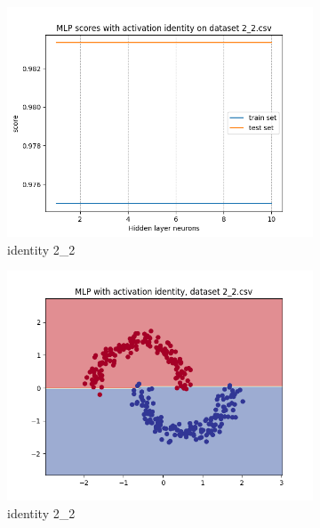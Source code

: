 \documentclass[12pt]{article}
\newcommand*{\subfigwidth}{0.24\textwidth}
\begin{document}
\begin{figure}[H]
\begin{subfigure}[t]{\subfigwidth}
        \includegraphics[width=\linewidth]{img/exp_1/mlp/2_2/identity/scores.png}
        \caption{identity 2\_2}
    \end{subfigure}
    \hfill
    \begin{subfigure}[t]{\subfigwidth}
        \includegraphics[width=\linewidth]{img/exp_1/mlp/2_2/identity/boundary.png}
        \caption{identity 2\_2}
    \end{subfigure}
    \hfill
    \begin{subfigure}[t]{\subfigwidth}

\end{subfigure}
\end{figure}
\end{document}
